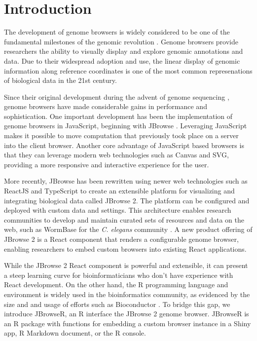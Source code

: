 \documentclass{bioinfo}
\begin{document}
\section{Introduction}

The development of genome browsers is widely considered to be one of the
fundamental milestones of the genomic revolution
\citep{packer2007clickable}. Genome browsers provide researchers the
ability to visually display and explore genomic annotations and data.
Due to their widespread adoption and use, the linear display of genomic
information along reference coordinates is one of the most common
represenations of biological data in the 21st century.

Since their original development during the advent of genome sequencing
\citep{kent2002human, birney2004overview}, genome browsers have made
considerable gains in performance and sophistication. One important
development has been the implementation of genome browsers in
JavaScript, beginning with JBrowse \citep{buels2016jbrowse}. Leveraging
JavaScript makes it possible to move computation that previously took
place on a server into the client browser. Another core advantage of
JavaScript based browsers is that they can leverage modern web
technologies such as Canvas and SVG, providing a more responsive and
interactive experience for the user.

More recently, JBrowse has been rewritten using newer web technologies
such as ReactJS and TypeScript to create an extensible platform for
visualizing and integrating biological data called JBrowse 2. The
platform can be configured and deployed with custom data and settings.
This architecture enables research communities to develop and maintain
curated sets of resources and data on the web, such as WormBase for the
\emph{C. elegans} community \citep{harris2010wormbase}. A new product
offering of JBrowse 2 is a React component that renders a configurable
genome browser, enabling researchers to embed custom browsers into
existing React applications.

While the JBrowse 2 React component is powerful and extensible, it can
present a steep learning curve for bioinformaticians who don't have
experience with React development. On the other hand, the R programming
language and environment is widely used in the bioinformatics community,
as evidenced by the size and and usage of efforts such as Bioconductor
\citep{huber2015orchestrating}. To bridge this gap, we introduce
JBrowseR, an R interface the JBrowse 2 genome browser. JBrowseR is an R
package with functions for embedding a custom browser instance in a
Shiny app, R Markdown document, or the R console.
\end{document}
